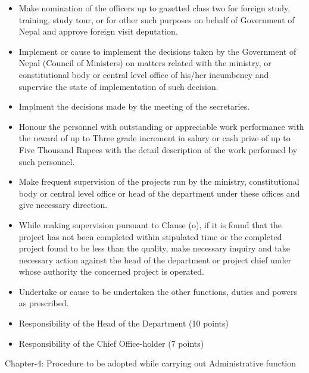 \documentclass[
  openany]{book}
\providecommand{\tightlist}{%
  \setlength{\itemsep}{0pt}\setlength{\parskip}{0pt}}
\begin{document}
\begin{itemize}
  \item Make nomination of the officers up to gazetted class two for foreign study, training, study tour, or for other such purposes on behalf of Government of Nepal and approve foreign visit deputation.
  \item Implement or cause to implement the decisions taken by the Government of Nepal (Council of Ministers) on matters related with the ministry, or constitutional body or central level office of his/her incumbency  and  supervise  the  state  of implementation of such decision.
  \item Implment the decisions made by the meeting of the secretaries.
  \item Honour  the  personnel  with  outstanding  or appreciable work performance with the reward of up to Three grade increment in salary or cash prize of up to Five Thousand Rupees with the detail description of the work performed by such personnel.
  \item Make frequent supervision of the projects run by the ministry, constitutional body or central level office or head of the department under these offices and give necessary direction.
  \item While making supervision pursuant to Clause (o), if it is found that the project has not been completed within stipulated time or the completed project found to be less than the quality, make necessary inquiry and take necessary action against the head of the department or project chief under whose authority the concerned project is operated.
  \item Undertake or cause to be undertaken the other functions, duties and powers as prescribed.
  \end{itemize}

\begin{itemize}
\tightlist
\item
  Responsibility of the Head of the Department (10 points)
\item
  Responsibility of the Chief Office-holder (7 points)
\end{itemize}

Chapter-4: Procedure to be adopted while carrying out Administrative function
\end{document}
